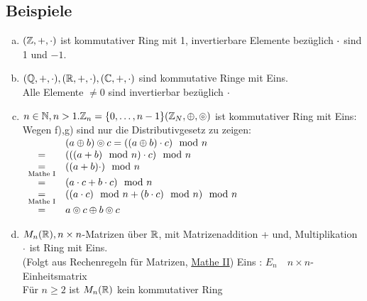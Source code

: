 \subsection{Beispiele}\label{sec:1.13}
\begin{enumerate}[a)]
\item $(\mathbb{Z},+,\cdot)$ ist kommutativer Ring mit 1, invertierbare Elemente bezüglich $\cdot$ sind 1 und $-1$.
\item $(\mathbb{Q},+,\cdot),(\mathbb{R},+,\cdot),(\mathbb{C},+,\cdot)$ sind kommutative Ringe mit Eins.\\
Alle Elemente $\ne 0$ sind invertierbar bezüglich $\cdot$
\item $n \in \mathbb{N}, n > 1.\\
\mathbb{Z}_n = \{0,\ldots,n-1 \}\\
(\mathbb{Z}_N, \oplus,\circledcirc)$ ist kommutativer Ring mit Eins:\\
Wegen  f),g) sind nur die Distributivgesetz zu zeigen:\\
$\begin{array}{cl}
&(a \oplus b)\circledcirc c = ((a \oplus b) \cdot c)\mod n\\
=&(((a+b)\mod n)\cdot c)\mod n\\
\underset{\text{Mathe I}}{=}& ((a+b)\cdot )\mod n \\
=&(a\cdot c + b \cdot c)\mod n\\
\underset{\text{Mathe I}}{=}& ((a \cdot c)\mod n + (b \cdot c)\mod n) \mod n\\
=& a \circledcirc c \oplus b \circledcirc c 
\end{array}$
\item $M_n(\mathbb{R}), n \times n$-Matrizen über $\mathbb{R}$, mit Matrizenaddition + und, Multiplikation $\cdot$ ist Ring mit Eins.\\
(Folgt aus Rechenregeln für Matrizen, \href{http://www.ffgti.org/skripte/MatheII.pdf}{Mathe II}) Eins : $E_n\quad n \times n$-Einheitsmatrix\\
Für $n \geq 2$ ist $M_n(\mathbb{R})$ kein kommutativer Ring
\end{enumerate}
